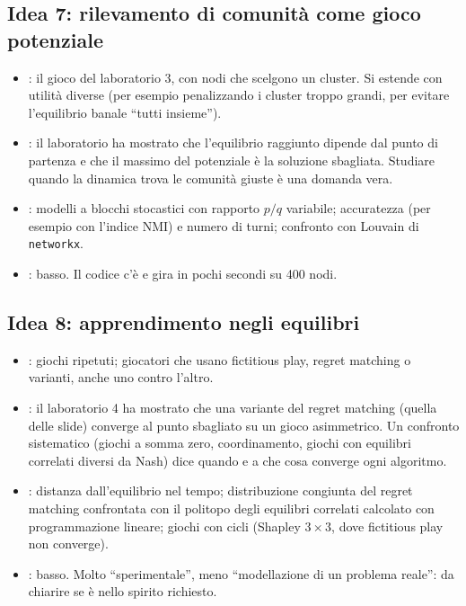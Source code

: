 \documentclass[11pt, a4paper, oneside, openany]{book}
\newcommand{\stato}[2]{\etichetta{#1}{#2}}
\newcommand{\sbloccata}[1]{\stato{blu}{DA LEZIONE #1}}
\begin{document}
\subsection*{Idea 7: rilevamento di comunità come gioco potenziale \hfill\sbloccata{3}}
\begin{itemize}
  \item {}: il gioco del laboratorio 3, con nodi che scelgono un cluster. Si
        estende con utilità diverse (per esempio penalizzando i cluster troppo grandi, per
        evitare l'equilibrio banale ``tutti insieme'').
  \item {}: il laboratorio ha mostrato che l'equilibrio raggiunto
        dipende dal punto di partenza e che il massimo del potenziale è la soluzione
        sbagliata. Studiare quando la dinamica trova le comunità giuste è una domanda vera.
  \item {}: modelli a blocchi stocastici con rapporto $p/q$ variabile;
        accuratezza (per esempio con l'indice NMI) e numero di turni; confronto con Louvain
        di \texttt{networkx}.
  \item {}: basso. Il codice c'è e gira in pochi secondi su 400 nodi.
\end{itemize}

\subsection*{Idea 8: apprendimento negli equilibri \hfill\sbloccata{4}}
\begin{itemize}
  \item {}: giochi ripetuti; giocatori che usano fictitious play, regret matching o
        varianti, anche uno contro l'altro.
  \item {}: il laboratorio 4 ha mostrato che una variante del regret
        matching (quella delle slide) converge al punto sbagliato su un gioco asimmetrico. Un
        confronto sistematico (giochi a somma zero, coordinamento, giochi con equilibri
        correlati diversi da Nash) dice quando e a che cosa converge ogni algoritmo.
  \item {}: distanza dall'equilibrio nel tempo; distribuzione congiunta del
        regret matching confrontata con il politopo degli equilibri correlati calcolato con
        programmazione lineare; giochi con cicli (Shapley $3\times3$, dove fictitious play
        non converge).
  \item {}: basso. Molto ``sperimentale'', meno ``modellazione di un problema
        reale'': da chiarire se è nello spirito richiesto.
\end{itemize}
\end{document}
